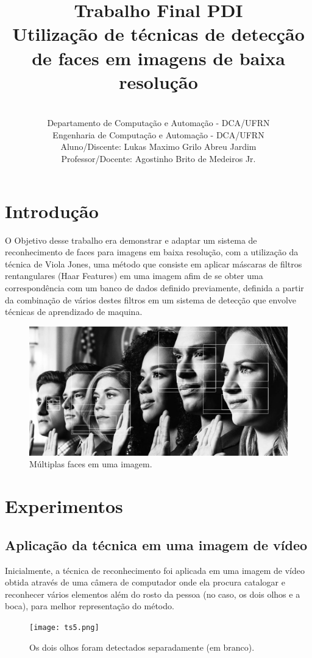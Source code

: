 \documentclass{article}
\title{Trabalho Final PDI\\
	Utilização de técnicas de detecção de faces em imagens de baixa resolução\\}
\author{\\Departamento de Computação e Automação - DCA/UFRN\\Engenharia de Computação e Automação - DCA/UFRN\\
	Aluno/Discente: Lukas Maximo Grilo Abreu Jardim\\Professor/Docente: Agostinho Brito de Medeiros Jr.}
\begin{document}
	\maketitle
	\newpage
	\section{Introdução}
	O Objetivo desse trabalho era demonstrar e adaptar um sistema de reconhecimento de faces para imagens em baixa resolução, com a utilização da técnica de Viola Jones, uma método que consiste em aplicar máscaras de filtros rentangulares (Haar Features) em uma imagem afim de se obter uma correspondência com um banco de dados definido previamente, definida a partir da combinação de vários destes filtros em um sistema de detecção que envolve técnicas de aprendizado de maquina.
	
	\begin{figure}
		\centering
		\includegraphics[scale = 0.4]{Face_track2.jpg}
		\caption{Múltiplas faces em uma imagem.}
	\end{figure}
	\newpage
	\section{Experimentos}
	\subsection{Aplicação da técnica em uma imagem de vídeo}
	Inicialmente, a técnica de reconhecimento foi aplicada em uma imagem de vídeo obtida através de uma câmera de computador onde ela procura catalogar e reconhecer vários elementos além do rosto da pessoa (no caso, os dois olhos e a boca), para melhor representação do método.
	\begin{figure}
		\centering
		\texttt{[image: ts5.png]}
		\caption{Os dois olhos foram detectados separadamente (em branco).}
	\end{figure}
	\newpage
\end{document}
